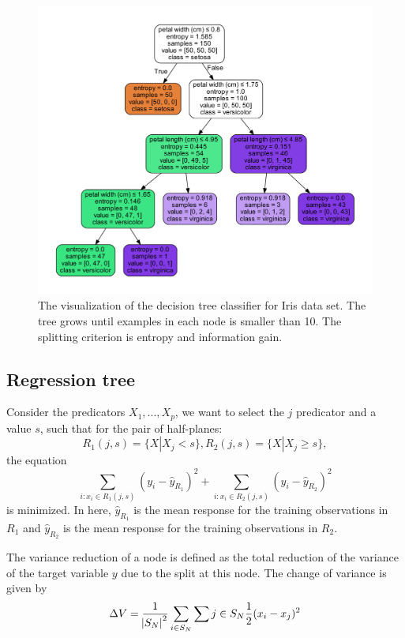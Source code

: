 \begin{refsection}
\begin{figure}[H]
	\centering
	\includegraphics[width=0.7\linewidth]{../figures/statisticalLearning/treeMethods/IrisDecisionTree_minSamplesEntropy}
	\caption{The visualization of the decision tree classifier for Iris data set. The tree grows until examples in each node is smaller than 10. The splitting criterion is entropy and information gain.}
	\label{fig:irisdecisiontreeminsamplesentropy}
\end{figure}



\subsection{Regression tree}

\begin{definition}
Consider the predicators $X_1,...,X_p$, we want to select the $j$ predicator and a value $s$, such that for the pair of half-planes:
$$R_1(j,s) = \{X|X_j < s\}, R_2(j,s) = \{X|X_j \geq s\},$$
the equation
$$\sum_{i:x_i\in R_1(j,s)} (y_i - \hat{y}_{R_1})^2 + \sum_{i:x_i\in R_2(j,s)} (y_i - \hat{y}_{R_2})^2$$
is minimized. In here, $\hat{y}_{R_1}$ is the mean response for the training observations in $R_1$ and $\hat{y}_{R_2}$ is the mean response for the training observations in $R_2$.
\end{definition}


\begin{remark}
The variance reduction of a node is defined as the total reduction of the variance of the target variable $y$ due to the split at this node. The change of variance is given by
\begin{align*}
\Delta V = \frac{1}{\abs{S_N}^2} \sum_{i \in S_N}\sum{j\in S_N}\frac{1}{2}(x_i-x_j)^2
\end{align*}	
	

\end{remark}
\end{refsection}
